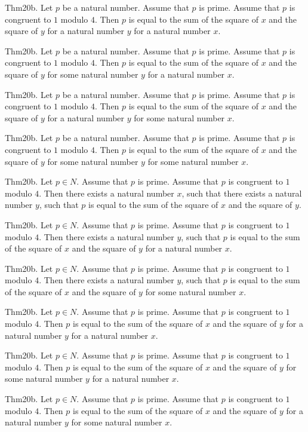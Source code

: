 \documentclass{article}
\begin{document}
Thm20b. Let $p$ be a natural number. Assume that $p$ is prime. Assume that $p$ is congruent to $1$ modulo $4$. Then $p$ is equal to the sum of the square of $x$ and the square of $y$ for a natural number $y$ for a natural number $x$.

Thm20b. Let $p$ be a natural number. Assume that $p$ is prime. Assume that $p$ is congruent to $1$ modulo $4$. Then $p$ is equal to the sum of the square of $x$ and the square of $y$ for some natural number $y$ for a natural number $x$.

Thm20b. Let $p$ be a natural number. Assume that $p$ is prime. Assume that $p$ is congruent to $1$ modulo $4$. Then $p$ is equal to the sum of the square of $x$ and the square of $y$ for a natural number $y$ for some natural number $x$.

Thm20b. Let $p$ be a natural number. Assume that $p$ is prime. Assume that $p$ is congruent to $1$ modulo $4$. Then $p$ is equal to the sum of the square of $x$ and the square of $y$ for some natural number $y$ for some natural number $x$.

Thm20b. Let $p \in N$. Assume that $p$ is prime. Assume that $p$ is congruent to $1$ modulo $4$. Then there exists a natural number $x$, such that there exists a natural number $y$, such that $p$ is equal to the sum of the square of $x$ and the square of $y$.

Thm20b. Let $p \in N$. Assume that $p$ is prime. Assume that $p$ is congruent to $1$ modulo $4$. Then there exists a natural number $y$, such that $p$ is equal to the sum of the square of $x$ and the square of $y$ for a natural number $x$.

Thm20b. Let $p \in N$. Assume that $p$ is prime. Assume that $p$ is congruent to $1$ modulo $4$. Then there exists a natural number $y$, such that $p$ is equal to the sum of the square of $x$ and the square of $y$ for some natural number $x$.

Thm20b. Let $p \in N$. Assume that $p$ is prime. Assume that $p$ is congruent to $1$ modulo $4$. Then $p$ is equal to the sum of the square of $x$ and the square of $y$ for a natural number $y$ for a natural number $x$.

Thm20b. Let $p \in N$. Assume that $p$ is prime. Assume that $p$ is congruent to $1$ modulo $4$. Then $p$ is equal to the sum of the square of $x$ and the square of $y$ for some natural number $y$ for a natural number $x$.

Thm20b. Let $p \in N$. Assume that $p$ is prime. Assume that $p$ is congruent to $1$ modulo $4$. Then $p$ is equal to the sum of the square of $x$ and the square of $y$ for a natural number $y$ for some natural number $x$.
\end{document}
